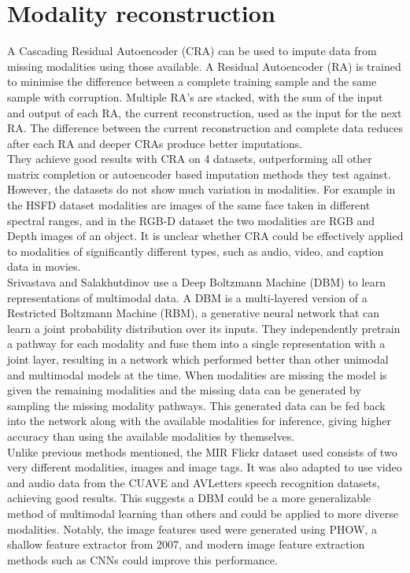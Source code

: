 \section{Modality reconstruction}
A Cascading Residual Autoencoder (CRA) \cite{CRA} can be used to impute data from missing modalities using those available. A Residual Autoencoder (RA) is trained to minimise the difference between a complete training sample and the same sample with corruption. Multiple RA’s are stacked, with the sum of the input and output of each RA, the current reconstruction, used as the input for the next RA. The difference between the current reconstruction and complete data reduces after each RA and deeper CRAs produce better imputations.\\

They achieve good results with CRA on 4 datasets, outperforming all other matrix completion or autoencoder based imputation methods they test against. However, the datasets do not show much variation in modalities. For example in the HSFD dataset modalities are images of the same face taken in different spectral ranges, and in the RGB-D dataset the two modalities are RGB and Depth images of an object. It is unclear whether CRA could be effectively applied to modalities of significantly different types, such as audio, video, and caption data in movies.\\

Srivastava and Salakhutdinov \cite{DBM} use a Deep Boltzmann Machine (DBM) to learn representations of multimodal data. A DBM is a multi-layered version of a Restricted Boltzmann Machine (RBM), a generative neural network that can learn a joint probability distribution over its inputs. They independently pretrain a pathway for each modality and fuse them into a single representation with a joint layer, resulting in a network which performed better than other unimodal and multimodal models at the time. When modalities are missing the model is given the remaining modalities and the missing data can be generated by sampling the missing modality pathways. This generated data can be fed back into the network along with the available modalities for inference, giving higher accuracy than using the available modalities by themselves.\\

Unlike previous methods mentioned, the MIR Flickr dataset used consists of two very different modalities, images and image tags. It was also adapted to use video and audio data from the CUAVE and AVLetters speech recognition datasets, achieving good results. This suggests a DBM could be a more generalizable method of multimodal learning than others and could be applied to more diverse modalities. Notably, the image features used were generated using PHOW, a shallow feature extractor from 2007, and modern image feature extraction methods such as CNNs could improve this performance.\\

